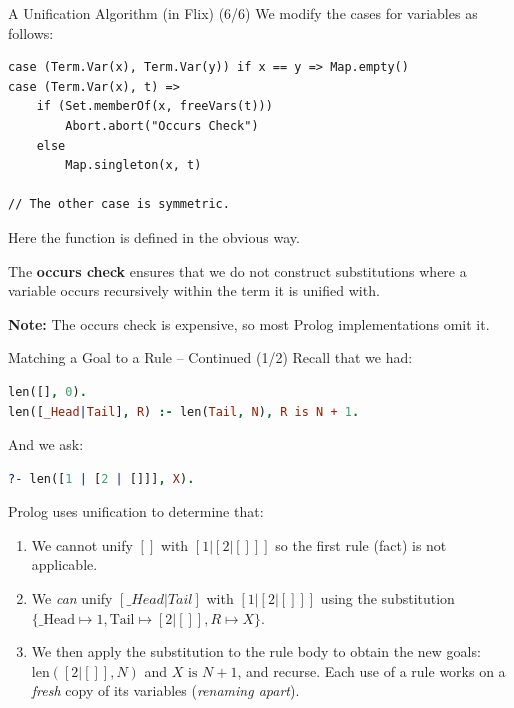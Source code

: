 \begin{frame}[fragile]{A Unification Algorithm (in Flix) (6/6)}
We modify the cases for variables as follows: 

\begin{lstlisting}[language=flix, xleftmargin=0.5cm]
case (Term.Var(x), Term.Var(y)) if x == y => Map.empty()
case (Term.Var(x), t) => 
    if (Set.memberOf(x, freeVars(t)))
        Abort.abort("Occurs Check")
    else 
        Map.singleton(x, t)

// The other case is symmetric.
\end{lstlisting}

Here the  function is defined in the obvious way.

The \textbf{occurs check} ensures that we do not construct substitutions where a
variable occurs recursively within the term it is unified with. 

\pause

\textbf{Note:} The occurs check is expensive, so most Prolog implementations omit it.
\end{frame}  

\begin{frame}[fragile]{Matching a Goal to a Rule -- Continued (1/2)}
Recall that we had: 

\begin{lstlisting}[language=prolog, xleftmargin=0.5cm]
len([], 0).
len([_Head|Tail], R) :- len(Tail, N), R is N + 1.
\end{lstlisting}

\pause

And we ask: 

\begin{lstlisting}[language=prolog, xleftmargin=0.5cm]
?- len([1 | [2 | []]], X).
\end{lstlisting}

\pause

Prolog uses unification to determine that:

\begin{enumerate}
    \item We cannot unify $[]$ with $[1 | [2 | []]]$ so the first rule (fact) is
    not applicable. \pause 
    \item We \emph{can} unify $[\_Head|Tail]$ with $[1 | [2 | []]]$ using the
    substitution $\{ \text{\_Head} \mapsto 1, \text{Tail} \mapsto [2 | []], R \mapsto X \}$. \pause
    \item We then apply the substitution to the rule body to obtain the new
    goals: $\text{len}([2 | []], N)$ and $X \text{ is } N + 1$, and recurse.
    Each use of a rule works on a \emph{fresh} copy of its variables
    (\emph{renaming apart}).
\end{enumerate}
\end{frame}

